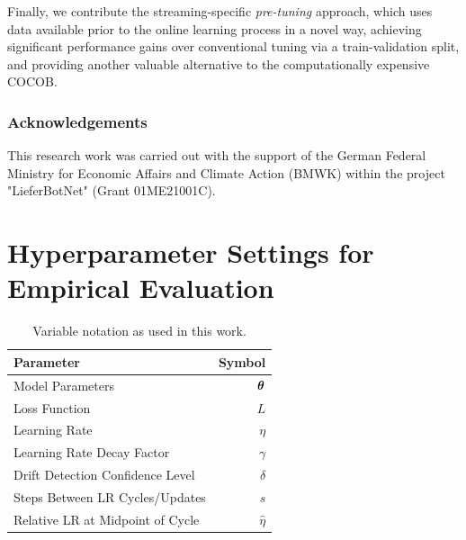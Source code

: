 \documentclass{article} %
\begin{document}
Finally, we contribute the streaming-specific \textit{pre-tuning} approach, which uses data available prior to the online learning process in a novel way, achieving significant performance gains over conventional tuning via a train-validation split, and providing another valuable alternative to the computationally expensive COCOB.

\subsubsection*{Acknowledgements}

This research work was carried out with the support of the German Federal Ministry for Economic Affairs and Climate Action (BMWK) within the project "LieferBotNet" (Grant 01ME21001C).




\newpage
\appendix
\section{Hyperparameter Settings for Empirical Evaluation}\label{app:hyperparams}

\begin{table}[h]
   \centering
   \caption{Variable notation as used in this work.}
   \begin{tabular}{lr}
      \toprule
      Parameter                        & Symbol       \\
      \midrule
      Model Parameters                 & ${\bm{\theta}} $   \\
      Loss Function                    & $L$          \\
      Learning Rate                    & $\eta$       \\
      Learning Rate Decay Factor       & $\gamma$     \\
      Drift Detection Confidence Level & $\delta$     \\
      Steps Between LR Cycles/Updates  & $s$          \\
      Relative LR at Midpoint of Cycle & $\hat{\eta}$ \\
      \bottomrule
   \end{tabular}
\end{table}
\end{document}
